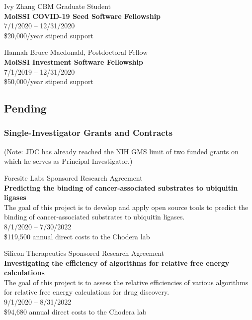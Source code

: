 \documentclass[10pt]{article}
\begin{document}
\vspace{1.5ex}

Ivy Zhang CBM Graduate Student\\
{\bf MolSSI COVID-19 Seed Software Fellowship}\\
7/1/2020 -- 12/31/2020\\
\$20,000/year stipend support

\vspace{1.5ex}

Hannah Bruce Macdonald, Postdoctoral Fellow\\
{\bf MolSSI Investment Software Fellowship}\\
7/1/2019 -- 12/31/2020\\
\$50,000/year stipend support



\eject
\subsection*{Pending}

\subsubsection*{Single-Investigator Grants and Contracts}

(Note: JDC has already reached the NIH GMS limit of two funded grants on which he serves as Principal Investigator.)

\vspace{1.5ex}

Foresite Labs Sponsored Research Agreement \\
{\bf Predicting the binding of cancer-associated substrates to ubiquitin ligases}\\
The goal of this project is to develop and apply open source tools to predict the binding of cancer-associated substrates to ubiquitin ligases.\\
8/1/2020 -- 7/30/2022\\
\$119,500 annual direct costs to the Chodera lab

\vspace{1.5ex}

Silicon Therapeutics Sponsored Research Agreement \\
{\bf Investigating the efficiency of algorithms for relative free energy calculations}\\
The goal of this project is to assess the relative efficiencies of various algorithms for relative free energy calculations for drug discovery.\\
9/1/2020 -- 8/31/2022\\
\$94,680 annual direct costs to the Chodera lab
\end{document}
